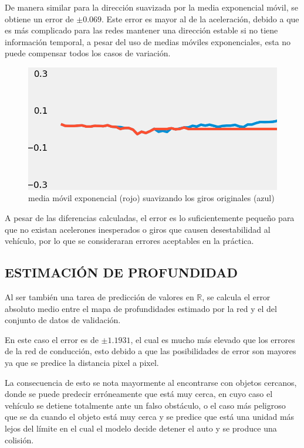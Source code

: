 	De manera similar para la dirección suavizada por la media exponencial móvil, se obtiene un error de $\pm 0.069$. Este error es mayor al de la aceleración, debido a que es más complicado para las redes mantener una dirección estable si no tiene información temporal, a pesar del uso de medias móviles exponenciales, esta no puede compensar todos los casos de variación.
	
	\begin{figure}[H]
		\centering
		\includegraphics[scale=0.3]{imagenes/preds/ema}
		\caption[Predicción Media Móvil Exponencial]{media móvil exponencial (rojo) suavizando los giros originales (azul)}
		\label{emapred}
	\end{figure}
	
	A pesar de las diferencias calculadas, el error es lo suficientemente pequeño para que no existan acelerones inesperados o giros que causen desestabilidad al vehículo, por lo que se consideraran errores aceptables en la práctica.
	
\subsection{ESTIMACIÓN DE PROFUNDIDAD}
	Al ser también una tarea de predicción de valores en $\mathbb{R}$, se calcula el error absoluto medio entre el mapa de profundidades estimado por la red y el del conjunto de datos de validación.
	
	En este caso el error es de $\pm 1.1931$, el cual es mucho más elevado que los errores de la red de conducción, esto debido a que las posibilidades de error son mayores ya que se predice la distancia pixel a pixel.

	La consecuencia de esto se nota mayormente al encontrarse con objetos cercanos, donde se puede predecir erróneamente que está muy cerca, en cuyo caso el vehículo se detiene totalmente ante un falso obstáculo, o el caso más peligroso que se da cuando el objeto está muy cerca y se predice que está una unidad más lejos del límite en el cual el modelo decide detener el auto y se produce una colisión.
	
